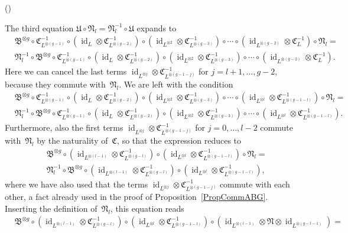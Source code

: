\documentclass[12pt]{article}
\makeatletter
\newcounter{num}
\newenvironment{pflist}{\begin{list}{(\arabic{num})}{\usecounter{num} \leftmargin0cm \itemindent5pt}}{\end{list}}
\theoremstyle{definition}
\theoremstyle{break}
\renewenvironment{proof}[1][\proofname]{\par
\vspace{-5pt}%
\pushQED{\qed}%
\normalfont
\topsep0pt \partopsep0pt %
\trivlist
\item[\hskip\labelsep
\bfseries
#1\@addpunct{.}]\ignorespaces
}{%
\popQED\endtrivlist\@endpefalse
\addvspace{6pt plus 6pt} %
}
\DeclareMathOperator\id{id}
\newcommand{\fB}{\mathfrak{B}}
\newcommand{\fC}{\mathfrak{C}}
\newcommand{\fN}{\mathfrak{N}}
\newcommand{\fU}{\mathfrak{U}}
\renewcommand{\1}{\mathbbm{1}}
\newcommand{\ot}{\mathbin{\otimes}}
\makeatother
\begin{document}
\begin{proof}
\begin{pflist}
\item
The third equation $\fU \circ \fN_l = \fN_l^{-1} \circ \fU$ expands to
\begin{align*}
&\fB^{\ot g} \circ \fC_{L^{\ot (g-1)}}^{-1} \circ (\id_L \ot \fC_{L^{\ot (g-2)}}^{-1})
\circ (\id_{L^{\ot 2}} \ot \fC_{L^{\ot (g-3)}}^{-1})
\circ \cdots \circ (\id_{L^{\ot (g-2)}} \ot \fC_{L}^{-1}) \circ \fN_l= \\
&\fN_l^{-1} \circ \fB^{\ot g} \circ \fC_{L^{\ot (g-1)}}^{-1} \circ (\id_L \ot \fC_{L^{\ot (g-2)}}^{-1})
\circ (\id_{L^{\ot 2}} \ot \fC_{L^{\ot (g-3)}}^{-1})
\circ \cdots \circ (\id_{L^{\ot (g-2)}} \ot \fC_{L}^{-1}).
\end{align*}
Here we can cancel the last terms
$\id_{L^{\ot j}} \ot \fC_{L^{\ot (g-1-j)}}^{-1}$
for $j=l+1,\dots,g-2$, because they commute with~$\fN_l$. We are left with the condition
\begin{align*}
&\fB^{\ot g} \circ \fC_{L^{\ot (g-1)}}^{-1} \circ (\id_L \ot \fC_{L^{\ot (g-2)}}^{-1})
\circ (\id_{L^{\ot 2}} \ot \fC_{L^{\ot (g-3)}}^{-1})
\circ \cdots \circ (\id_{L^{\ot l}} \ot \fC_{L^{\ot (g-1-l)}}^{-1}) \circ \fN_l= \\
&\fN_l^{-1} \circ \fB^{\ot g} \circ \fC_{L^{\ot (g-1)}}^{-1} \circ (\id_L \ot \fC_{L^{\ot (g-2)}}^{-1})
\circ (\id_{L^{\ot 2}} \ot \fC_{L^{\ot (g-3)}}^{-1})
\circ \cdots \circ (\id_{L^{\ot l}} \ot \fC_{L^{\ot (g-1-l)}}^{-1}).
\end{align*}
Furthermore, also the first terms
$\id_{L^{\ot j}} \ot \fC_{L^{\ot (g-1-j)}}^{-1}$
for $j=0,\dots,l-2$ commute with~$\fN_l$ by the naturality of~$\fC$, so that the expression reduces to
\begin{align*}
&\fB^{\ot g} \circ (\id_{L^{\ot (l-1)}} \ot \fC_{L^{\ot (g-l)}}^{-1}) \circ (\id_{L^{\ot l}} \ot \fC_{L^{\ot (g-1-l)}}^{-1}) \circ \fN_l= \\
&\fN_l^{-1} \circ \fB^{\ot g} \circ (\id_{L^{\ot (l-1)}} \ot \fC_{L^{\ot (g-l)}}^{-1}) \circ (\id_{L^{\ot l}} \ot \fC_{L^{\ot (g-1-l)}}^{-1}),
\end{align*}
where we have also used that the terms $\id_{L^{\ot j}} \ot \fC_{L^{\ot (g-1-j)}}^{-1}$ commute with each other, a fact already used in the proof of Proposition~\ref{PropCommABG}. Inserting the definition of~$\fN_l$, this equation reads
\begin{align*}
&\fB^{\ot g} \circ (\id_{L^{\ot (l-1)}} \ot \fC_{L^{\ot (g-l)}}^{-1}) \circ (\id_{L^{\ot l}} \ot \fC_{L^{\ot (g-1-l)}}^{-1}) \circ (\id_{L^{\ot (l-1)}} \ot \fN \ot \id_{L^{\ot (g-l-1)}}) = \\

\end{align*}
\end{pflist}
\end{proof}
\end{document}
